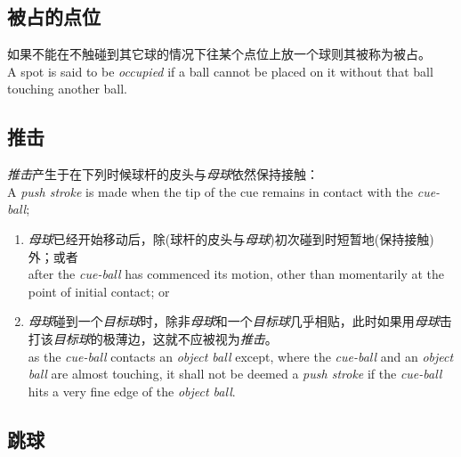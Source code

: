 \subsection{被占的点位}

\noindent 如果不能在不触碰到其它球的情况下往某个点位上放一个球则其被称为被占。\\
A spot is said to be \emph{occupied} if a ball cannot be placed on it without that ball touching another ball.

\subsection{推击}

\noindent \emph{推击}产生于在下列时候球杆的皮头与\emph{母球}依然保持接触：\\
A \emph{push stroke} is made when the tip of the cue remains in contact with the \emph{cue-ball};
\begin{enumerate}[label=(\alph*)]
    \item \emph{母球}已经开始移动后，除(球杆的皮头与\emph{母球})初次碰到时短暂地(保持接触)外；或者\\
    after the \emph{cue-ball} has commenced its motion, other than momentarily at the point of initial contact; or
    \item \emph{母球}碰到一个\emph{目标球}时，除非\emph{母球}和一个\emph{目标球}几乎相贴，此时如果用\emph{母球}击打该\emph{目标球}的极薄边，这就不应被视为\emph{推击}。\\
    as the \emph{cue-ball} contacts an \emph{object ball} except, where the \emph{cue-ball} and an \emph{object ball} are almost touching, it shall not be deemed a \emph{push stroke} if the \emph{cue-ball} hits a very fine edge of the \emph{object ball}.
\end{enumerate}

\subsection{跳球}

